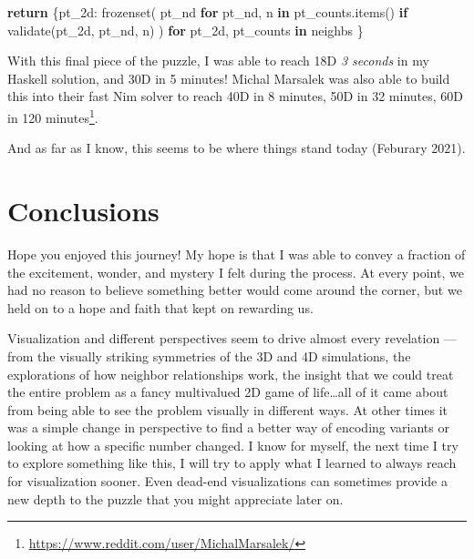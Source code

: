 \documentclass[]{article}
\newenvironment{Shaded}{}{}
\newcommand{\BuiltInTok}[1]{#1}
\newcommand{\ControlFlowTok}[1]{\textcolor[rgb]{0.00,0.44,0.13}{\textbf{#1}}}
\newcommand{\KeywordTok}[1]{\textcolor[rgb]{0.00,0.44,0.13}{\textbf{#1}}}
\newcommand{\NormalTok}[1]{#1}
\renewcommand{\href}[2]{#2\footnote{\url{#1}}}
\begin{document}
\begin{Shaded}
\begin{Highlighting}[]
    \ControlFlowTok{return}\NormalTok{ \{pt\_2d: }\BuiltInTok{frozenset}\NormalTok{(}
\NormalTok{                       pt\_nd }\ControlFlowTok{for}\NormalTok{ pt\_nd, n }\KeywordTok{in}\NormalTok{ pt\_counts.items()}
                             \ControlFlowTok{if}\NormalTok{ validate(pt\_2d, pt\_nd, n)}
\NormalTok{                   )}
              \ControlFlowTok{for}\NormalTok{ pt\_2d, pt\_counts }\KeywordTok{in}\NormalTok{ neighbs}
\NormalTok{           \}}
\end{Highlighting}
\end{Shaded}

With this final piece of the puzzle, I was able to reach 18D \emph{3 seconds} in
my Haskell solution, and 30D in 5 minutes! Michal Marsalek was also able to
build this into their fast Nim solver to
\href{https://www.reddit.com/user/MichalMarsalek/}{reach 40D in 8 minutes, 50D
in 32 minutes, 60D in 120 minutes}.

And as far as I know, this seems to be where things stand today (Feburary 2021).

\hypertarget{conclusions}{%
\section{Conclusions}\label{conclusions}}

Hope you enjoyed this journey! My hope is that I was able to convey a fraction
of the excitement, wonder, and mystery I felt during the process. At every
point, we had no reason to believe something better would come around the
corner, but we held on to a hope and faith that kept on rewarding us.

Visualization and different perspectives seem to drive almost every revelation
--- from the visually striking symmetries of the 3D and 4D simulations, the
explorations of how neighbor relationships work, the insight that we could treat
the entire problem as a fancy multivalued 2D game of life\ldots all of it came
about from being able to see the problem visually in different ways. At other
times it was a simple change in perspective to find a better way of encoding
variants or looking at how a specific number changed. I know for myself, the
next time I try to explore something like this, I will try to apply what I
learned to always reach for visualization sooner. Even dead-end visualizations
can sometimes provide a new depth to the puzzle that you might appreciate later
on.
\end{document}
